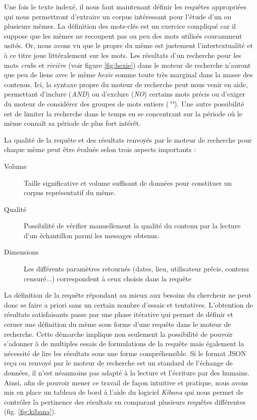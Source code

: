     Une fois le texte indexé, il nous faut maintenant définir les requêtes appropriées qui nous permettront d'extraire un corpus intéressant pour l'étude d'un ou plusieurs mèmes. La définition des mots-clés est un exercice compliqué car il suppose que les mèmes ne recoupent pas ou peu des mots utilisés couramment usités. Or, nous avons vu que le propre du mème est justement l'intertextualité et à ce titre joue littéralement sur les mots. Les résultats d'un recherche pour les mots \textit{crabe} et \textit{rivière} (voir figure \ref{fig:hexie}) dans le moteur de recherche n'auront que peu de liens avec le mème \textit{hexie} somme toute très marginal dans la masse des contenus. Ici, la syntaxe propre du moteur de recherche peut nous venir en aide, permettant d'inclure (\textit{AND}) ou d'exclure (\textit{NO}) certains mots précis ou d'exiger du moteur de considérer des groupes de mots entiers (\textit{""}). Une autre possibilité est de limiter la recherche dans le temps en se concentrant sur la période où le  mème connaît sa période de plus fort intérêt.

    La qualité de la requête et des résultats renvoyés par le moteur de recherche pour chaque mème peut être évaluée selon trois aspects importants :

    \begin{description}
        \item[Volume]
            Taille significative et volume suffisant de données pour constituer un corpus représentatif du mème.
        \item[Qualité]
            Possibilité de vérifier manuellement la qualité du contenu par la lecture d{\textquoteright}un échantillon parmi les messages obtenus.
        \item[Dimensions]
            Les différents paramètres retournés (dates, lieu, utilisateur précis, contenu censuré...) correspondent à ceux choisis dans la requête
    \end{description}

    La définition de la requête répondant au mieux aux besoins du chercheur  ne peut donc se faire a priori sans un certain nombre d'essais et tentatives. L'obtention de résultats satisfaisants passe par une phase itérative qui permet de définir et cerner une définition du mème sous forme d'une requête dans le moteur de recherche. Cette démarche implique non seulement la possibilité de pouvoir s'adonner à de multiples essais de formulations de la requête mais également la nécessité de lire les résultats sous une forme compréhensible. Si le format JSON reçu ou renvoyé par le moteur de recherche est un standard de l'échange de données, il n'est néanmoins pas adapté à la lecture et l'écriture par des humains. Ainsi, afin de pouvoir mener ce travail de façon intuitive et pratique, nous avons mis en place un tableau de bord à l'aide du logiciel \textit{Kibana} qui nous permet de contr\^oler la pertinence des résultats en comparant plusieurs requêtes différentes (fig. \ref{fig:kibana}).


